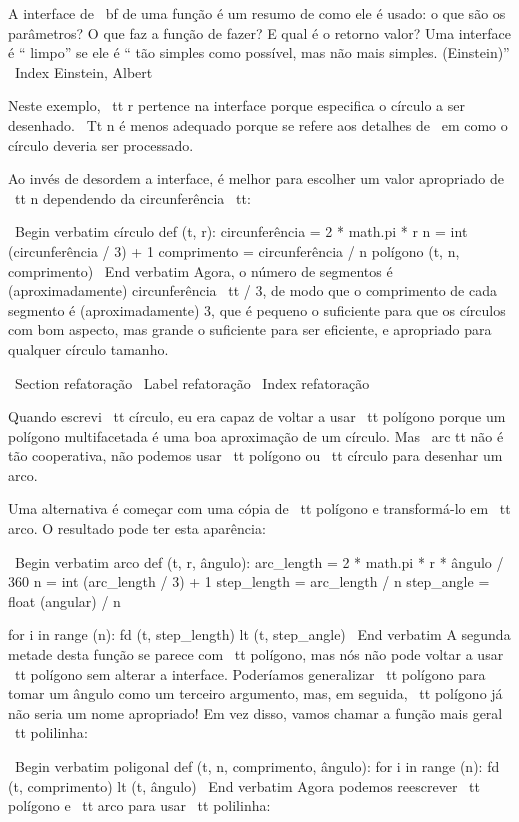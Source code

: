 \documentclass[10pt]{book}
\begin{document}
{A interface de {\ bf} de uma função é um resumo de como ele é usado: o que
são os parâmetros? O que faz a função de fazer? E qual é o retorno
valor? Uma interface é `` limpo'' se ele é `` tão simples como
possível, mas não mais simples. (Einstein)''
\ Index {Einstein, Albert}

Neste exemplo, {\ tt r} pertence na interface porque
especifica o círculo a ser desenhado. {\ Tt n} é menos adequado
porque se refere aos detalhes de {\ em como} o círculo deveria
ser processado.

Ao invés de desordem a interface, é melhor
para escolher um valor apropriado de {\ tt n}
dependendo da circunferência {\ tt}:

\ Begin {verbatim}
círculo def (t, r):
    circunferência = 2 * math.pi * r
    n = int (circunferência / 3) + 1
    comprimento = circunferência / n
    polígono (t, n, comprimento)
\ End {verbatim}
%
Agora, o número de segmentos é (aproximadamente) {circunferência \ tt / 3},
de modo que o comprimento de cada segmento é (aproximadamente) 3, que é pequeno
o suficiente para que os círculos com bom aspecto, mas grande o suficiente para ser eficiente,
e apropriado para qualquer círculo tamanho.


\ Section {} refatoração
\ Label {} refatoração
\ Index {} refatoração

Quando escrevi {\ tt círculo}, eu era capaz de voltar a usar {\ tt polígono}
porque um polígono multifacetada é uma boa aproximação de um círculo.
Mas {\ arc tt} não é tão cooperativa, não podemos usar {\ tt polígono}
ou {\ tt círculo} para desenhar um arco.

Uma alternativa é começar com uma cópia
de {\ tt polígono} e transformá-lo em {\ tt arco}. O resultado
pode ter esta aparência:

\ Begin {verbatim}
arco def (t, r, ângulo):
    arc_length = 2 * math.pi * r * ângulo / 360
    n = int (arc_length / 3) + 1
    step_length = arc_length / n
    step_angle = float (angular) / n
    
    for i in range (n):
        fd (t, step_length)
        lt (t, step_angle)
\ End {verbatim}
%
A segunda metade desta função se parece com {\ tt polígono}, mas nós
não pode voltar a usar {\ tt polígono} sem alterar a interface. Poderíamos
generalizar {\ tt polígono} para tomar um ângulo como um terceiro argumento,
mas, em seguida, {\ tt polígono} já não seria um nome apropriado!
Em vez disso, vamos chamar a função mais geral {\ tt polilinha}:

\ Begin {verbatim}
poligonal def (t, n, comprimento, ângulo):
    for i in range (n):
        fd (t, comprimento)
        lt (t, ângulo)
\ End {verbatim}
%
Agora podemos reescrever {\ tt polígono} e {\ tt arco} para usar {\ tt polilinha}:

}
\end{document}
